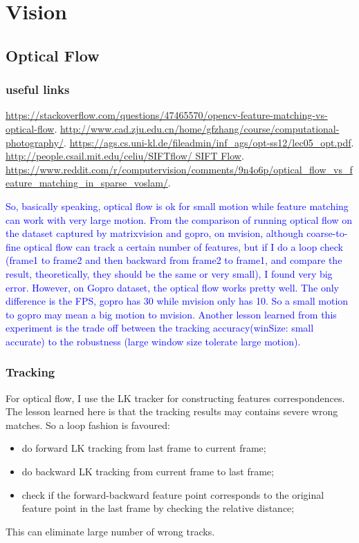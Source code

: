 \documentclass[a4paper]{report}
\begin{document}
\chapter{Vision}
\section{Optical Flow}
\subsection{useful links}
\url{https://stackoverflow.com/questions/47465570/opencv-feature-matching-vs-optical-flow}.
\url{http://www.cad.zju.edu.cn/home/gfzhang/course/computational-photography/}.
\url{https://ags.cs.uni-kl.de/fileadmin/inf_ags/opt-ss12/lec05_opt.pdf}.
\url{http://people.csail.mit.edu/celiu/SIFTflow/ SIFT Flow}.
\url{https://www.reddit.com/r/computervision/comments/9n4o6p/optical_flow_vs_feature_matching_in_sparse_voslam/}.

\textcolor{blue}{So, basically speaking, optical flow is ok for small motion while feature matching can work with very large motion. From the comparison of running optical flow on the dataset captured by matrixvision and gopro, on mvision, although coarse-to-fine optical flow can track a certain number of features, but if I do a loop check (frame1 to frame2 and then backward from frame2 to frame1, and compare the result, theoretically, they should be the same or very small), I found very big error. However, on Gopro dataset, the optical flow works pretty well. The only difference is the FPS, gopro has 30 while mvision only has 10. So a small motion to gopro may mean a big motion to mvision. Another lesson learned from this experiment is the trade off between the tracking accuracy(winSize: small accurate) to the robustness (large window size tolerate large motion).}

\subsection{Tracking}
For optical flow, I use the LK tracker for constructing features correspondences. The lesson learned here is that the tracking results may contains severe wrong matches. So a loop fashion is favoured: 
\begin{itemize}
	\item do forward LK tracking from last frame to current frame;
	\item do backward LK tracking from current frame to last frame;
	\item check if the forward-backward feature point corresponds to the original feature point in the last frame by checking the relative distance; 
\end{itemize}
This can eliminate large number of wrong tracks.
\end{document}
